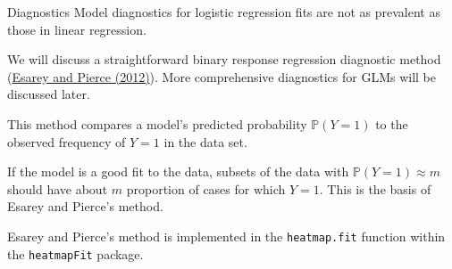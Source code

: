 \documentclass[
  ignorenonframetext,
]{beamer}
\newenvironment{Shaded}{\begin{snugshade}}{\end{snugshade}}
\newcommand{\FunctionTok}[1]{\textcolor[rgb]{0.00,0.00,0.00}{#1}}
\newcommand{\NormalTok}[1]{#1}
\newcommand{\OtherTok}[1]{\textcolor[rgb]{0.56,0.35,0.01}{#1}}
\newcommand{\SpecialCharTok}[1]{\textcolor[rgb]{0.00,0.00,0.00}{#1}}
\begin{document}
\begin{frame}{Diagnostics}
\protect\hypertarget{diagnostics}{}
Model diagnostics for logistic regression fits are not as prevalent as
those in linear regression.

\vspace{12pt}

We will discuss a straightforward binary response regression diagnostic
method
(\href{https://econpapers.repec.org/article/cuppolals/v_3a20_3ay_3a2012_3ai_3a04_3ap_3a480-500_5f01.htm}{Esarey
and Pierce (2012)}). More comprehensive diagnostics for GLMs will be
discussed later.

\vspace{12pt}

This method compares a model's predicted probability
\(\mathbb{P}(Y = 1)\) to the observed frequency of \(Y=1\) in the data
set.

\vspace{12pt}

If the model is a good fit to the data, subsets of the data with
\(\mathbb{P}(Y = 1) \approx m\) should have about \(m\) proportion of
cases for which \(Y = 1\). This is the basis of Esarey and Pierce's
method.
\end{frame}

\begin{frame}[fragile]{}
\protect\hypertarget{section-2}{}
Esarey and Pierce's method is implemented in the \texttt{heatmap.fit}
function within the \texttt{heatmapFit} package.

\begin{Shaded}
\end{Shaded}
\end{frame}
\end{document}
